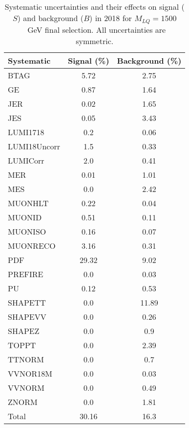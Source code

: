 \begin{table}[htbp]
\begin{center}
\caption{Systematic uncertainties and their effects on signal ($S$) and background ($B$) in 2018 for $M_{LQ}=1500$~GeV final selection. All uncertainties are symmetric.}
\begin{tabular}{lcc}
\hline\hline
Systematic & Signal (\%) & Background (\%) \\ \hline 
BTAG & 5.72 & 2.75\\ 
GE & 0.87 & 1.64\\ 
JER & 0.02 & 1.65\\ 
JES & 0.05 & 3.43\\ 
LUMI1718 & 0.2 & 0.06\\ 
LUMI18Uncorr & 1.5 & 0.33\\ 
LUMICorr & 2.0 & 0.41\\ 
MER & 0.01 & 1.01\\ 
MES & 0.0 & 2.42\\ 
MUONHLT & 0.22 & 0.04\\ 
MUONID & 0.51 & 0.11\\ 
MUONISO & 0.16 & 0.07\\ 
MUONRECO & 3.16 & 0.31\\ 
PDF & 29.32 & 9.02\\ 
PREFIRE & 0.0 & 0.03\\ 
PU & 0.12 & 0.53\\ 
SHAPETT & 0.0 & 11.89\\ 
SHAPEVV & 0.0 & 0.26\\ 
SHAPEZ & 0.0 & 0.9\\ 
TOPPT & 0.0 & 2.39\\ 
TTNORM & 0.0 & 0.7\\ 
VVNOR18M & 0.0 & 0.03\\ 
VVNORM & 0.0 & 0.49\\ 
ZNORM & 0.0 & 1.81\\ 
Total & 30.16 & 16.3\\ \hline \hline
\end{tabular}
\label{tab:SysUncertainties_uujj_1500}
\end{center}
\end{table}

